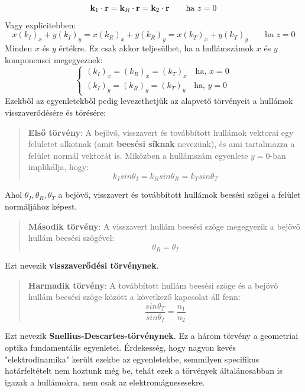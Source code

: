 \documentclass[a4paper,12pt]{article}
\begin{document}
\begin{equation}
    \bold{k}_1 \cdot \bold{r} = \bold{k}_R \cdot \bold{r} = \bold{k}_2 \cdot \bold{r} \qquad \text{ha } z = 0
\end{equation}
Vagy explicitebben:
\begin{equation}
    x(k_I)_x + y(k_I)_y = x(k_R)_x + y(k_R)_y = x(k_T)_x + y(k_T)_y \qquad \text{ha } z = 0
\end{equation}
Minden $x$ és $y$ értékre. Ez csak akkor teljesülhet, ha a hullámszámok $x$ és $y$ komponensei megegyeznek:
\begin{equation}
    \begin{cases}
        (k_I)_x = (k_R)_x = (k_T)_x \quad \text{ha, } x = 0\\
        (k_I)_y = (k_R)_y = (k_T)_y \quad \text{ha, } y = 0
    \end{cases}
\end{equation}
Ezekből az egyenletekből pedig levezethetjük az alapvető törvényeit a hullámok visszaverődésére és törésére:
\begin{quote}
     \textbf{Első törvény}: A bejövő, visszavert és továbbított hullámok vektorai egy felületet alkotnak (amit \textbf{beesési síknak} nevezünk), és ami tartalmazza a felület normál vektorát is. 
     Miközben a hullámszám egyenlete $y = 0$-ban implikálja, hogy:
        \begin{equation}
            k_I sin \theta_I = k_R sin \theta_R = k_T sin \theta_T
        \end{equation}
\end{quote}
Ahol $\theta_I, \theta_R, \theta_T$ a bejövő, visszavert és továbbított hullámok beesési szögei a felület normáljához képest.
\begin{quote}
    \textbf{Második törvény}: A visszavert hullám beesési szöge megegyezik a bejövő hullám beesési szögével:
        \begin{equation}
            \theta_R = \theta_I
        \end{equation}
\end{quote}
Ezt nevezik \textbf{visszaverődési törvénynek}.
\begin{quote}
    \textbf{Harmadik törvény}: A továbbított hullám beesési szöge és a bejövő hullám beesési szöge között a következő kapcsolat áll fenn:
        \begin{equation}
            \frac{sin \theta_T}{sin \theta_I} = \frac{n_1}{n_2}
        \end{equation}
\end{quote}
Ezt nevezik \textbf{Snellius-Descartes-törvénynek}. Ez a három törvény a geometriai optika fundamentális egyenletei. Érdekesség, hogy nagyon kevés "elektrodinamika" került ezekbe az egyenletekbe,
semmilyen specifikus határfeltételt nem hoztunk még be, tehát ezek a törvények általánosabban is igazak a hullámokra, nem csak az elektromágnesesekre.
\end{document}
